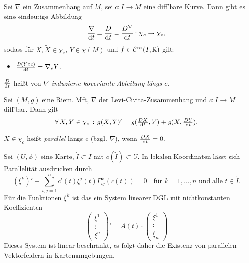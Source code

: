 \documentclass{cheat-sheet}
\newcommand{\coord}[1]{\tfrac{\partial^\phi}{\partial x^{#1}}} %
\newcommand{\Cont}{\mathcal{C}} %
\begin{document}
\begin{satz}
  Sei $\nabla$ ein Zusammenhang auf $M$, sei $c : I \to M$ eine diff'bare Kurve. Dann gibt es eine eindeutige Abbildung
  \[ \frac{\nabla}{\mathrm{d} t} = \frac{D}{\mathrm{d} t} = \frac{D^\nabla}{\mathrm{d} t} : \chi_c \to \chi_c, \]
  sodass für $X, \tilde{X} \in \chi_c$, $Y \in \chi(M)$ und $f \in \Cont^\infty(I, \R)$ gilt:
  \begin{itemize}
    \item $\tfrac{D (Y \circ c)}{\mathrm{d} t} = \nabla_{\dot{c}} Y$.
  \end{itemize}
\end{satz}

\begin{defn}
  $\tfrac{D}{\mathrm{d} t}$ heißt von $\nabla$ \emph{induzierte kovariante Ableitung längs $c$}.
\end{defn}


\begin{satz}
  Sei $(M, g)$ eine Riem. Mft, $\nabla$ der Levi-Civita-Zusammenhang und $c : I \to M$ diff'bar. Dann gilt
  \[ \forall \, {X, Y \in \chi_c} \,:\, g(X, Y)' = g(\tfrac{D X}{\mathrm{d} t}, Y) + g(X, \tfrac{D Y}{\mathrm{d} t}). \]
\end{satz}


\begin{defn}
  $X \in \chi_c$ heißt \emph{parallel} längs $c$ (bzgl. $\nabla$), wenn $\tfrac{D X}{\mathrm{d} t} = 0$.
\end{defn}

\begin{bem}
  Sei $(U, \phi)$ eine Karte, $\tilde{I} \subset I$ mit $c(\tilde{I}) \subset U$.
  In lokalen Koordinaten lässt sich Parallelität ausdrücken durch
  \[
    (\xi^{k})' + \sum_{i,j=1}^n \dot{c}^i(t) \xi^j (t) \Gamma_{ij}^k(c(t)) = 0
    \quad \text{für $k = 1, \ldots, n$ und alle $t \in \tilde{I}$.}
  \]
  Für die Funktionen $\xi^k$ ist das ein System linearer DGL mit nichtkonstanten Koeffizienten
  \[
    \begin{pmatrix}
      \xi^1 \\
      \vdots \\
      \xi^n
    \end{pmatrix}' = A(t) \cdot
    \begin{pmatrix}
      \xi^1 \\
      \vdots \\
      \xi_n
    \end{pmatrix}
  \]
  Dieses System ist linear beschränkt, es folgt daher die Existenz von parallelen Vektorfeldern in Kartenumgebungen.
\end{bem}
\end{document}
